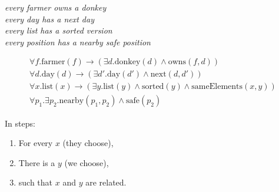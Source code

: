 \documentclass[xetex,aspectratio=169,14pt,hyperref={pdfpagelabels=true,pdflang={en-GB}}]{beamer}
\begin{document}
\begin{frame}[t]

  \begin{center}
    \emph{every farmer owns a donkey} \\ %
    \emph{every day has a next day} \\
    \emph{every list has a sorted version} \\
    \emph{every position has a nearby safe position}
  \end{center}
  \begin{displaymath}
    \begin{array}{c}
      \forall f. \mathrm{farmer}(f) \to (\exists d. \mathrm{donkey}(d) \land \mathrm{owns}(f,d))\\
      \forall d. \mathrm{day}(d) \to (\exists d'. \mathrm{day}(d') \land \mathrm{next}(d,d')) \\
      \forall x. \mathrm{list}(x) \to (\exists y. \mathrm{list}(y) \land \mathrm{sorted}(y) \land \mathrm{sameElements}(x,y)) \\
      \forall p_1. \exists p_2. \mathrm{nearby}(p_1,p_2) \land \mathrm{safe}(p_2)
    \end{array}
  \end{displaymath}

  In steps:
  \begin{enumerate}
  \item For every $x$ (they choose),
  \item There is a $y$ (we choose),
  \item such that $x$ and $y$ are related.
  \end{enumerate}

\end{frame}
\end{document}
